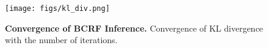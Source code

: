 \begin{figure}[t]
\vspace{-0.7cm}
  \centering
  \texttt{[image: figs/kl\_div.png]}
  \vspace{-0.3cm}
  \caption[Convergence of BCRF Inference]{{\bf Convergence of BCRF Inference.} Convergence of KL divergence with the number of iterations.\vspace{0.0cm}}
  \label{fig:kl_div}
\vspace{0.5cm}
\end{figure}

